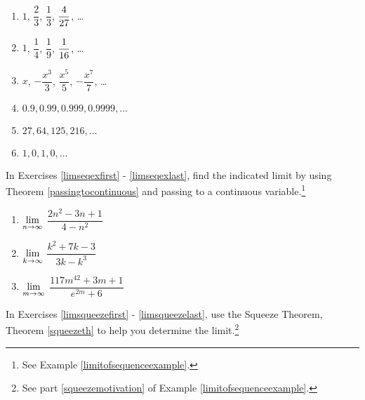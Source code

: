 \begin{multicols}{3}
\begin{enumerate}
\setcounter{enumi}{\value{HW}}

\item $1$, $\dfrac{2}{3}$, $\dfrac{1}{3}$, $\dfrac{4}{27} \vphantom{\dfrac{x^7}{7}}$, \ldots
\item $1$, $\dfrac{1}{4}$, $\dfrac{1}{9}$, $\dfrac{1}{16} \vphantom{-\dfrac{x^7}{7}}$, \ldots
\item $x$, $-\dfrac{x^3}{3}$, $\dfrac{x^5}{5}$, $-\dfrac{x^7}{7}$, \ldots

\item $0.9, 0.99, 0.999, 0.9999, \ldots$
\item $27, 64, 125, 216, \ldots$
\item $1, 0, 1, 0, \ldots$ \label{nthtermlast}

\setcounter{HW}{\value{enumi}}
\end{enumerate}
\end{multicols}



In Exercises \ref{limseqexfirst} - \ref{limseqexlast}, find the indicated limit by using Theorem \ref{passingtocontinuous} and passing to a continuous variable.\footnote{See Example \ref{limitofsequenceexample}.}


\begin{multicols}{3}
\begin{enumerate}
\setcounter{enumi}{\value{HW}}

\item\label{limseqexfirst}  $\displaystyle{\lim_{n \rightarrow \infty}}$ $\dfrac{2n^2 - 3n+1}{4-n^2}$

\item  $\displaystyle{\lim_{k \rightarrow \infty}}$ $\dfrac{k^2 +7k-3}{3k - k^3}$

\item\label{limseqexlast}  $\displaystyle{\lim_{m \rightarrow \infty}}$ $\dfrac{117m^{42} + 3m + 1}{e^{2m} + 6}$

\setcounter{HW}{\value{enumi}}
\end{enumerate}
\end{multicols}


In Exercises \ref{limsqueezefirst} - \ref{limsqueezelast}, use the Squeeze Theorem,  Theorem \ref{squeezeth} to help you determine the limit.\footnote{See part \ref{squeezemotivation} of Example \ref{limitofsequenceexample}.}


